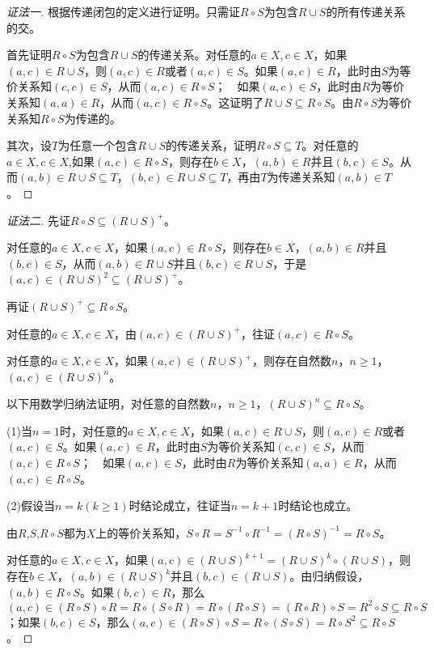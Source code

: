 \begin{proof}[证法一]
  根据传递闭包的定义进行证明。只需证$R\circ S$为包含$R\cup S$的所有传递关系的交。

  首先证明$R\circ S$为包含$R\cup S$的传递关系。对任意的$a\in X,c\in X$，如果$(a,c)\in R\cup S$，则$(a,c)\in R$或者$(a,c)\in S$。如果$(a,c)\in R$，此时由$S$为等价关系知$(c,c)\in S$，从而$(a,c)\in R\circ S$；　如果$(a,c)\in S$，此时由$R$为等价关系知$(a,a)\in R$，从而$(a,c)\in R\circ S$。这证明了$R\cup S\subseteq R\circ S$。由$R\circ S$为等价关系知$R\circ S$为传递的。

  其次，设$T$为任意一个包含$R\cup S$的传递关系，证明$R\circ S \subseteq T$。对任意的$a\in X,c\in X$,如果$(a,c)\in R\circ S$，则存在$b\in X$，$(a,b)\in R$并且$(b,c)\in S$。从而$(a,b)\in R\cup S \subseteq T$，$(b,c)\in R\cup S \subseteq T$，再由$T$为传递关系知$(a,b)\in T$。
\end{proof}

\begin{proof}[证法二]
  先证$R\circ S\subseteq (R\cup S)^+$。

  对任意的$a\in X,c\in X$，如果$(a,c)\in R\circ S$，则存在$b\in X$，$(a,b)\in R$并且$(b,c)\in S$，从而$(a,b)\in R\cup S$并且$(b,c)\in R\cup S$，于是$(a,c)\in (R\cup S)^2 \subseteq (R\cup S)^+$。

  再证$(R\cup S)^+\subseteq R\circ S$。

  对任意的$a\in X,c\in X$，由$(a,c)\in (R\cup S)^+$，往证$(a,c)\in R\circ S$。

  对任意的$a\in X,c\in X$，如果$(a,c)\in (R\cup S)^+$，则存在自然数$n$，$n\geq 1$，　$(a,c)\in (R\cup S)^n$。

  以下用数学归纳法证明，对任意的自然数$n$，$n\geq 1$，$(R\cup S)^n\subseteq R\circ S$。

  (1)当$n=1$时，对任意的$a\in X,c\in X$，如果$(a,c)\in R\cup S$，则$(a,c)\in R$或者$(a,c)\in S$。如果$(a,c)\in R$，此时由$S$为等价关系知$(c,c)\in S$，从而$(a,c)\in R\circ S$；　如果$(a,c)\in S$，此时由$R$为等价关系知$(a,a)\in R$，从而$(a,c)\in R\circ S$。

  (2)假设当$n=k(k\geq 1)$时结论成立，往证当$n=k+1$时结论也成立。

  由$R$,$S$,$R\circ S$都为$X$上的等价关系知，$S\circ R=S^{-1}\circ R^{-1}=(R\circ S)^{-1}=R\circ S$。

  对任意的$a\in X,c\in X$，如果$(a,c)\in (R\cup S)^{k+1}=(R\cup S)^k\circ (R\cup S)$，则存在$b\in X$，$(a,b)\in (R\cup S)^k$并且$(b,c)\in (R\cup S)$。由归纳假设，$(a,b)\in R\circ S$。如果$(b,c)\in R$，那么$(a,c)\in (R\circ S)\circ R = R\circ (S\circ R) = R\circ (R\circ S) = (R\circ R)\circ S = R^2\circ S \subseteq R\circ S$；如果$(b,c)\in S$，那么$(a,c)\in (R\circ S)\circ S = R\circ (S\circ S) = R\circ S^2 \subseteq R\circ S$。
  

  
\end{proof}

